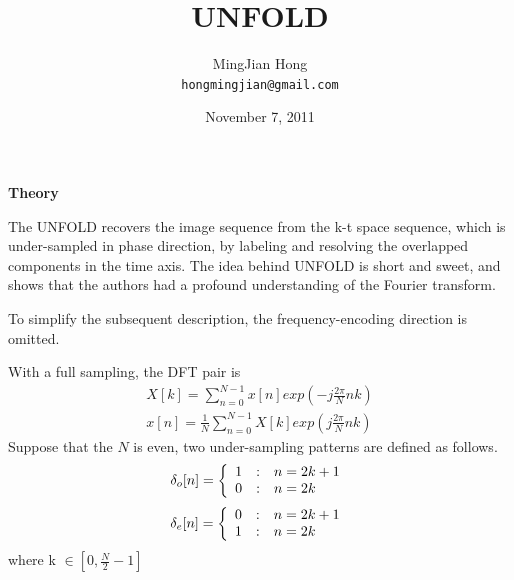 \documentclass[12pt,a4paper]{article}
\begin{document}
\begin{CJK}{UTF8}{songti}

\title{UNFOLD}
\author{MingJian Hong \\ \texttt{hongmingjian@gmail.com}}
\date{November 7, 2011} %
\maketitle

\textbf{Theory}

The UNFOLD recovers the image sequence from the k-t space sequence, which is under-sampled in phase direction, by labeling and resolving the overlapped components in the time axis. The idea behind UNFOLD is short and sweet, and shows that the authors had a profound understanding of the Fourier transform.

To simplify the subsequent description, the frequency-encoding direction is omitted.

With a full sampling, the DFT pair is
\begin{eqnarray}
X[k]=\sum_{n=0}^{N-1}x[n]exp(-j \frac{2 \pi}{N} nk)            \\
x[n]=\frac{1}{N}\sum_{n=0}^{N-1}X[k]exp( j \frac{2 \pi}{N} nk)
\end{eqnarray}
Suppose that the $N$ is even, two under-sampling patterns are defined as follows.
\[ 
\delta_{o}[n] = \left\{ \begin{array} 
                 {r@{\quad:\quad}l}
                 1 & n = 2k+1 \\  0 & n = 2k
                 \end{array}  \right.  \]
\[ 
\delta_{e}[n] = \left\{ \begin{array} 
                 {r@{\quad:\quad}l}
                 0 & n = 2k+1 \\  1 & n = 2k
                 \end{array}  \right.  \]
where k $\in [0, \frac{N}{2}-1]$


\end{CJK}
\end{document}
